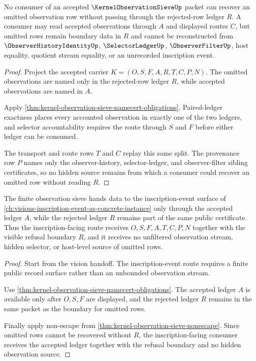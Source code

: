 \begin{theorem}
\label{thm:kernel-observation-sieve-nonescape}
No consumer of an accepted $\KernelObservationSieveUp$ packet can recover an omitted observation row without passing through the rejected-row ledger $R$. A consumer may read accepted observations through $A$ and displayed routes $C$, but omitted rows remain boundary data in $R$ and cannot be reconstructed from $\ObserverHistoryIdentityUp$, $\SelectorLedgerUp$, $\ObserverFilterUp$, host equality, quotient stream equality, or an unrecorded inscription event.
\end{theorem}
\begin{proof}
Project the accepted carrier $K=(O,S,F,A,R,T,C,P,N)$. The omitted observations are named only in the rejected-row ledger $R$, while accepted observations are named in $A$.

Apply \autoref{thm:kernel-observation-sieve-namecert-obligations}. Paired-ledger exactness places every accounted observation in exactly one of the two ledgers, and selector accountability requires the route through $S$ and $F$ before either ledger can be consumed.

The transport and route rows $T$ and $C$ replay this same split. The provenance row $P$ names only the observer-history, selector-ledger, and observer-filter sibling certificates, so no hidden source remains from which a consumer could recover an omitted row without reading $R$.
\end{proof}

\begin{theorem}
\label{thm:kernel-observation-sieve-inscription-handoff}
The finite observation sieve hands data to the inscription-event surface of \autoref{ch:visions-inscription-event-as-concrete-instance} only through the accepted ledger $A$, while the rejected ledger $R$ remains part of the same public certificate. Thus the inscription-facing route receives $O,S,F,A,T,C,P,N$ together with the visible refusal boundary $R$, and it receives no unfiltered observation stream, hidden selector, or host-level source of omitted rows.
\end{theorem}
\begin{proof}
Start from the vision handoff. The inscription-event route requires a finite public record surface rather than an unbounded observation stream.

Use \autoref{thm:kernel-observation-sieve-namecert-obligations}. The accepted ledger $A$ is available only after $O,S,F$ are displayed, and the rejected ledger $R$ remains in the same packet as the boundary for omitted rows.

Finally apply non-escape from \autoref{thm:kernel-observation-sieve-nonescape}. Since omitted rows cannot be recovered without $R$, the inscription-facing consumer receives the accepted ledger together with the refusal boundary and no hidden observation source.
\end{proof}

